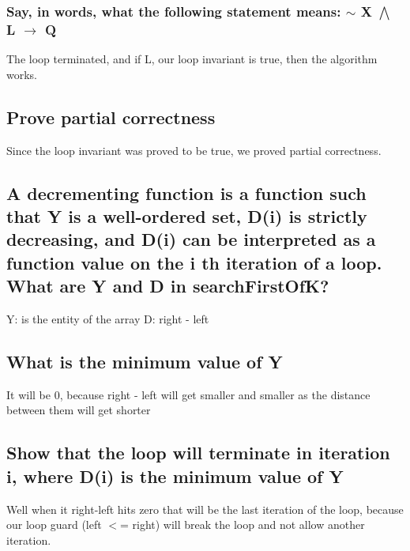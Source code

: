 \documentclass[10pt,letterpaper]{article}
\begin{document}
\subsubsection{Say, in words, what the following statement
means: $\sim$ X $\bigwedge$ L $\rightarrow$ Q  }
The loop terminated, and if L, our loop invariant is true, then the algorithm works.

\subsection{Prove partial correctness}
Since the loop invariant was proved to be true, we proved partial correctness.

\subsection{A decrementing function is a
function such that Y is a well-ordered set,
D(i) is strictly decreasing, and D(i) can be
interpreted as a function value on the i
th iteration
of a loop. What are Y and D in
searchFirstOfK?
}
Y: is the entity of the array
D: right - left 

\subsection{What is the minimum value of Y}
It will be 0, because right - left will get smaller and smaller as the distance between them will get shorter 
\subsection{Show that the loop will terminate in iteration i,
where D(i) is the minimum value of Y}
Well when it right-left hits zero that will be the last iteration of the loop, because our loop guard (left $<$= right) will break the loop and not allow another iteration. 
\end{document}
